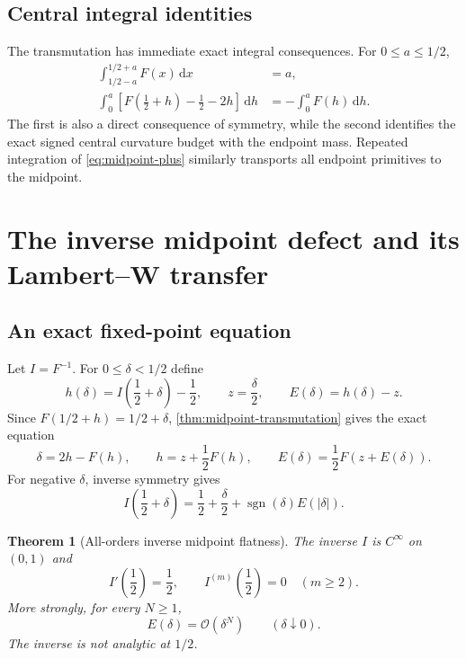 \documentclass[11pt,oneside]{article}
\newtheorem{theorem}{Theorem}[section]
\theoremstyle{definition}
\theoremstyle{remark}
\newcommand{\dd}{\,\mathrm d}
\newcommand{\bigO}{\mathcal O}
\DeclareMathOperator{\sgn}{sgn}
\begin{document}
\subsection{Central integral identities}
The transmutation has immediate exact integral consequences.  For $0\le a\le1/2$,
\begin{align}
 \int_{1/2-a}^{1/2+a}F(x)\dd x&=a,
 \label{eq:central-mass}\\
 \int_0^a\left[F\!\left(\frac12+h\right)-\frac12-2h\right]\dd h
 &=-\int_0^aF(h)\dd h.
 \label{eq:central-defect-integral}
\end{align}
The first is also a direct consequence of symmetry, while the second identifies the exact signed central curvature budget with the endpoint mass.  Repeated integration of \eqref{eq:midpoint-plus} similarly transports all endpoint primitives to the midpoint.

\section{The inverse midpoint defect and its Lambert--W transfer}
\label{sec:inverse-midpoint}

\subsection{An exact fixed-point equation}
Let $I=F^{-1}$.  For $0\le\delta<1/2$ define
\begin{equation}
 h(\delta)=I\!\left(\frac12+\delta\right)-\frac12,
 \qquad z=\frac\delta2,
 \qquad E(\delta)=h(\delta)-z.
 \label{eq:inverse-definitions}
\end{equation}
Since $F(1/2+h)=1/2+\delta$, \cref{thm:midpoint-transmutation} gives the exact equation
\begin{equation}
 \delta=2h-F(h),
 \qquad
 h=z+\frac12F(h),
 \qquad
 E(\delta)=\frac12F(z+E(\delta)).
 \label{eq:inverse-fixed-point}
\end{equation}
For negative $\delta$, inverse symmetry gives
\begin{equation}
 I\!\left(\frac12+\delta\right)
 =\frac12+\frac\delta2+\sgn(\delta)E(|\delta|).
 \label{eq:inverse-odd-defect}
\end{equation}

\begin{theorem}[All-orders inverse midpoint flatness]
\label{thm:inverse-flatness}
The inverse $I$ is $C^\infty$ on $(0,1)$ and
\begin{equation}
 I'\!\left(\frac12\right)=\frac12,
 \qquad I^{(m)}\!\left(\frac12\right)=0\quad(m\ge2).
 \label{eq:inverse-jet}
\end{equation}
More strongly, for every $N\ge1$,
\begin{equation}
 E(\delta)=\bigO(\delta^N)\qquad(\delta\downarrow0).
 \label{eq:E-flat}
\end{equation}
The inverse is not analytic at $1/2$.
\end{theorem}
\end{document}
